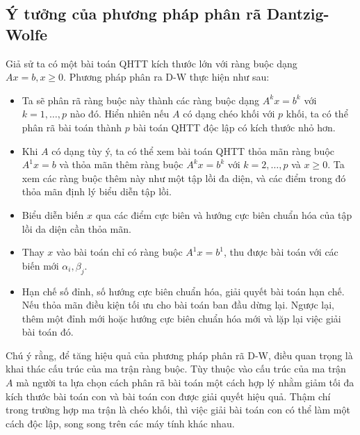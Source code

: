 \subsection{Ý tưởng của phương pháp phân rã Dantzig-Wolfe}
 Giả sử ta có một bài toán QHTT kích thước lớn với ràng buộc dạng $Ax=b, x\geq 0$. 
Phương pháp phân ra D-W thực hiện như sau:
\begin{itemize}
\item Ta sẽ phân rã ràng buộc này thành các ràng buộc dạng $A^kx=b^k$ với $k=1, \dots, p$ nào đó. Hiển nhiên nếu $A$ có dạng chéo khối với $p$ khối, ta có thể phân rã bài toán thành $p$ bài toán QHTT độc lập có kích thước nhỏ hơn. 
\item Khi $A$ có dạng tùy ý, ta có thể xem bài toán QHTT thỏa mãn ràng buộc $A^1x=b$ và thỏa mãn thêm ràng buộc $A^kx=b^k$ với $k=2,\dots, p$ và $x\geq 0$. Ta xem các ràng buộc thêm này như một tập lồi đa diện, và các điểm trong đó thỏa mãn định lý biểu diễn tập lồi. 
\item Biểu diễn biến $x$ qua các điểm cực biên và hướng cực biên chuẩn hóa của tập lồi da diện cần thỏa mãn.
\item Thay $x$ vào bài toán chỉ có ràng buộc $A^1x=b^1$, thu được bài toán với các biến mới $\alpha_i,\beta_j$.
\item Hạn chế số đỉnh, số hướng cực biên chuẩn hóa, giải quyết bài toán hạn chế. Nếu thỏa mãn điều kiện tối ưu cho bài toán ban đầu dừng lại. Ngược lại, thêm một đỉnh mới hoặc hướng cực biên chuẩn hóa mới và lặp lại việc giải bài toán đó.
\end{itemize}
Chú ý rằng, để tăng hiệu quả của phương pháp phân rã D-W, điều quan trọng là khai thác cấu trúc của ma trận ràng buộc. Tùy thuộc vào cấu trúc của ma trận $A$ mà người ta lựa chọn cách phân rã bài toán một cách hợp lý nhằm giảm tối đa kích thước bài toán con và bài toán con được giải quyết hiệu quả. Thậm chí trong trường hợp ma trận là chéo khối, thì việc giải bài toán con có thể làm một cách độc lập, song song trên các máy tính khác nhau.

